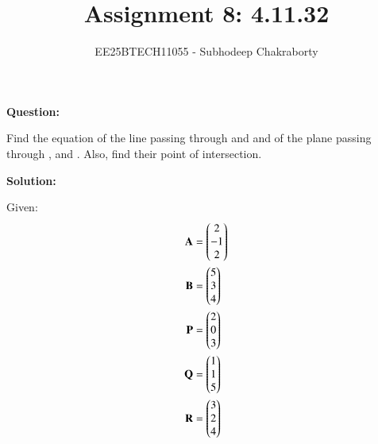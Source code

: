 \documentclass[journal,12pt,onecolumn]{IEEEtran}
\theoremstyle{remark}
\begin{document}

\vspace{3cm}

\title{Assignment 8: 4.11.32}
\author{EE25BTECH11055 - Subhodeep Chakraborty}
\maketitle
\hrulefill
\bigskip

\renewcommand{\thefigure}{\theenumi}
\renewcommand{\thetable}{\theenumi}

\textbf{Question:}\par
Find the equation of the line passing through  and  and of the plane passing through ,  and . Also, find their point of intersection. \hfill {}
\par
\textbf{Solution:}\par

Given:
\begin{align}
 \mathbf{A} &= \begin{pmatrix}2\\-1\\2\end{pmatrix} \\
 \mathbf{B} &= \begin{pmatrix}5\\3\\4\end{pmatrix} \\
 \mathbf{P} &= \begin{pmatrix}2\\0\\3\end{pmatrix} \\
 \mathbf{Q} &= \begin{pmatrix}1\\1\\5\end{pmatrix} \\
 \mathbf{R} &= \begin{pmatrix}3\\2\\4\end{pmatrix}
\end{align}
\end{document}
